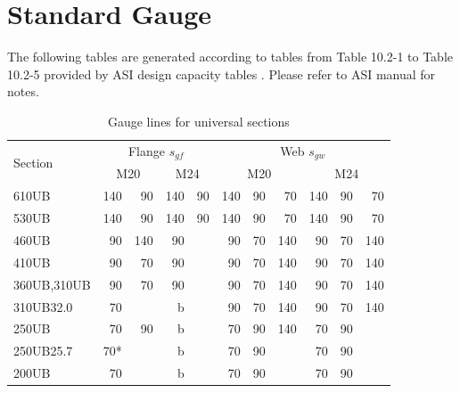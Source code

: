 \section{Standard Gauge}
The following tables are generated according to tables from Table 10.2-1 to Table 10.2-5 provided by ASI design capacity tables \citep{ASI2016}. Please refer to ASI manual for notes.
\begin{table}[H]
\centering\footnotesize
\caption{Gauge lines for universal sections}\label{tab:universal_gauge}
\begin{minipage}{.8\linewidth}\centering
\begin{tabular}{l|rr|rr|rrr|rrr}
	\toprule
	\multirow{2}[0]{*}{Section} &        \multicolumn{4}{c|}{Flange $s_{gf}$}         &          \multicolumn{6}{c}{Web $s_{gw}$}          \\
	                            & \multicolumn{2}{c|}{M20} & \multicolumn{2}{c|}{M24} & \multicolumn{3}{c|}{M20} & \multicolumn{3}{c}{M24} \\ \midrule
	610UB                       &  140 &                90 & 140 &                 90 & 140 & 90 &            70 & 140 & 90 &           70 \\
	530UB                       &  140 &                90 & 140 &                 90 & 140 & 90 &            70 & 140 & 90 &           70 \\
	460UB                       &   90 &               140 &  90 &                    &  90 & 70 &           140 &  90 & 70 &          140 \\
	410UB                       &   90 &                70 &  90 &                    &  90 & 70 &           140 &  90 & 70 &          140 \\
	360UB,310UB                 &   90 &                70 &  90 &                    &  90 & 70 &           140 &  90 & 70 &          140 \\
	310UB32.0                   &   70 &                   &   b &                    &  90 & 70 &           140 &  90 & 70 &          140 \\
	250UB                       &   70 &                90 &   b &                    &  70 & 90 &           140 &  70 & 90 &              \\
	250UB25.7                   &  70* &                   &   b &                    &  70 & 90 &               &  70 & 90 &              \\
	200UB                       &   70 &                   &   b &                    &  70 & 90 &               &  70 & 90 &              \\

\end{tabular}
\end{minipage}
\end{table}
